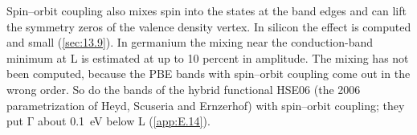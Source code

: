 Spin--orbit coupling also mixes spin into the states at the band edges and can lift the symmetry zeros of the valence density vertex. In silicon the effect is computed and small (\cref{sec:13.9}). In germanium the mixing near the conduction-band minimum at L is estimated at up to 10 percent in amplitude. The mixing has not been computed, because the PBE bands with spin--orbit coupling come out in the wrong order. So do the bands of the hybrid functional HSE06 (the 2006 parametrization of Heyd, Scuseria and Ernzerhof) with spin--orbit coupling; they put $\mathrm{\Gamma}$ about \SI{0.1}{eV} below L (\cref{app:E.14}).

